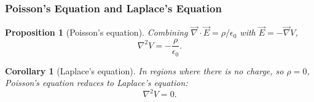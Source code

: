\documentclass{article}
\newtheorem{corollary}{Corollary}[theorem]
\newtheorem{proposition}{Proposition}
\begin{document}
\subsubsection{Poisson's Equation and Laplace's Equation}
\begin{proposition}[Poisson's equation]
    Combining $\vec{\nabla}\cdot\vec{E} = \rho/\epsilon_0$ with $\vec{E} = -\vec{\nabla}V$,
    \begin{equation}
        \label{eq:poisson}
        \nabla^2 V = -\frac{\rho}{\epsilon_0}.
    \end{equation}
\end{proposition}
\begin{corollary}[Laplace's equation]
    In regions where there is no charge, so $\rho = 0$, Poisson's equation reduces to Laplace's equation:
    \begin{equation}
        \label{eq:laplace}
        \nabla^2 V = 0.
    \end{equation}
\end{corollary}
\end{document}
